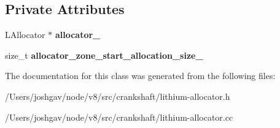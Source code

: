 \subsection*{Private Attributes}
\begin{DoxyCompactItemize}
\item 
L\+Allocator $\ast$ {\bfseries allocator\+\_\+}\hypertarget{classv8_1_1internal_1_1_l_allocator_phase_a8042f6f8d71f47accd3ee2ab75e099b1}{}\label{classv8_1_1internal_1_1_l_allocator_phase_a8042f6f8d71f47accd3ee2ab75e099b1}

\item 
size\+\_\+t {\bfseries allocator\+\_\+zone\+\_\+start\+\_\+allocation\+\_\+size\+\_\+}\hypertarget{classv8_1_1internal_1_1_l_allocator_phase_a7d7ac2ac1c4324403078c5c34163f033}{}\label{classv8_1_1internal_1_1_l_allocator_phase_a7d7ac2ac1c4324403078c5c34163f033}

\end{DoxyCompactItemize}


The documentation for this class was generated from the following files\+:\begin{DoxyCompactItemize}
\item 
/\+Users/joshgav/node/v8/src/crankshaft/lithium-\/allocator.\+h\item 
/\+Users/joshgav/node/v8/src/crankshaft/lithium-\/allocator.\+cc\end{DoxyCompactItemize}
